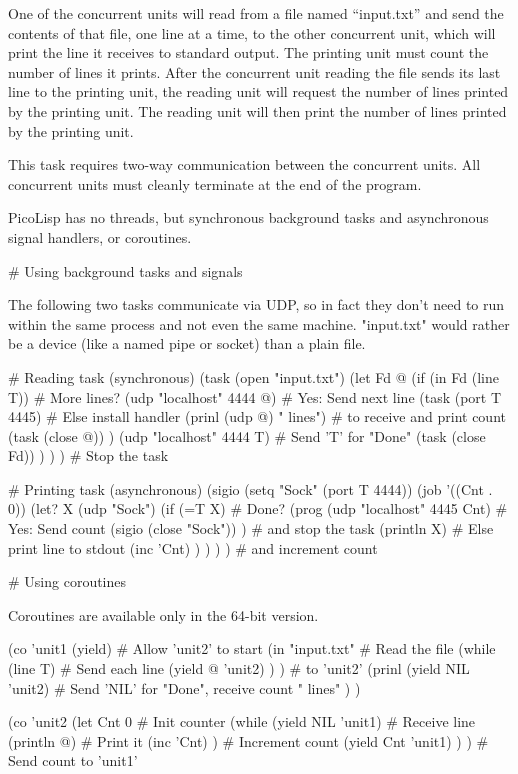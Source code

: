 One of the concurrent units will read from a file named ``input.txt''
and send the contents of that file, one line at a time, to the other
concurrent unit, which will print the line it receives to standard
output. The printing unit must count the number of lines it prints.
After the concurrent unit reading the file sends its last line to the
printing unit, the reading unit will request the number of lines printed
by the printing unit. The reading unit will then print the number of
lines printed by the printing unit.

This task requires two-way communication between the concurrent units.
All concurrent units must cleanly terminate at the end of the program.


\begin{wideverbatim}

PicoLisp has no threads, but synchronous background tasks and asynchronous
signal handlers, or coroutines.

# Using background tasks and signals

The following two tasks communicate via UDP, so in fact they don't need to run
within the same process and not even the same machine. "input.txt" would rather
be a device (like a named pipe or socket) than a plain file.

# Reading task (synchronous)
(task (open "input.txt")
   (let Fd @
      (if (in Fd (line T))             # More lines?
         (udp "localhost" 4444 @)      # Yes: Send next line
         (task (port T 4445)           # Else install handler
            (prinl (udp @) " lines")   # to receive and print count
            (task (close @)) )
         (udp "localhost" 4444 T)      # Send 'T' for "Done"
         (task (close Fd)) ) ) )       # Stop the task

# Printing task (asynchronous)
(sigio (setq "Sock" (port T 4444))
   (job '((Cnt . 0))
      (let? X (udp "Sock")
         (if (=T X)                    # Done?
            (prog
               (udp "localhost" 4445 Cnt) # Yes: Send count
               (sigio (close "Sock")) )   # and stop the task
            (println X)                # Else print line to stdout
            (inc 'Cnt) ) ) ) )         # and increment count

# Using coroutines

Coroutines are available only in the 64-bit version.

(co 'unit1
   (yield)                       # Allow 'unit2' to start
   (in "input.txt"               # Read the file
      (while (line T)            # Send each line
         (yield @ 'unit2) ) )    # to 'unit2'
   (prinl
      (yield NIL 'unit2)         # Send 'NIL' for "Done", receive count
      " lines" ) )

(co 'unit2
   (let Cnt 0                    # Init counter
      (while (yield NIL 'unit1)  # Receive line
         (println @)             # Print it
         (inc 'Cnt) )            # Increment count
      (yield Cnt 'unit1) ) )     # Send count to 'unit1'

\end{wideverbatim}

